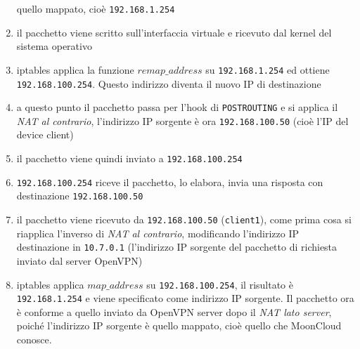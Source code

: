 \begin{enumerate}
		      quello mappato, cioè \texttt{192.168.1.254}
		\item il pacchetto viene scritto sull'interfaccia virtuale e ricevuto dal kernel
		      del sistema operativo
		\item iptables applica la funzione $remap\_address$ su \texttt{192.168.1.254} ed ottiene
		      \texttt{192.168.100.254}. Questo indirizzo diventa il nuovo IP di destinazione
		\item a questo punto il pacchetto passa per l'hook di \texttt{POSTROUTING} e si applica il
		      \textit{NAT al contrario}, l'indirizzo IP sorgente è ora \texttt{192.168.100.50}
		      (cioè l'IP del device client)
		\item il pacchetto viene quindi inviato a \texttt{192.168.100.254}
		\item \texttt{192.168.100.254} riceve il pacchetto, lo elabora, invia una risposta
		      con destinazione \texttt{192.168.100.50}
		\item il pacchetto viene ricevuto da \texttt{192.168.100.50} (\texttt{client1}),
		      come prima cosa
		      si riapplica l'inverso di \textit{NAT al contrario}, modificando l'indirizzo IP
		      destinazione in \texttt{10.7.0.1} (l'indirizzo IP sorgente del pacchetto di richiesta
		      inviato dal server OpenVPN)
		\item iptables applica $map\_address$ su \texttt{192.168.100.254}, il risultato è
		      \texttt{192.168.1.254} e viene specificato come indirizzo IP sorgente.
		      Il pacchetto ora è conforme a quello inviato da OpenVPN server dopo il
		      \textit{NAT lato server}, poiché l'indirizzo IP sorgente è quello mappato, cioè quello
		      che MoonCloud conosce.

\end{enumerate}
